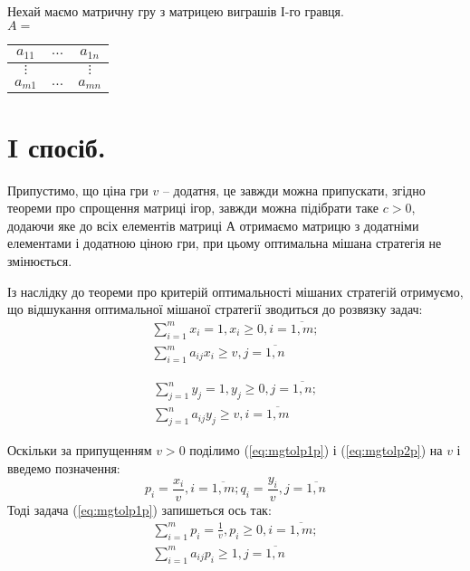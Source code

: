 \documentclass[12pt,a4paper]{report}
\begin{document}
Нехай маємо матричну гру з матрицею виграшів І-го гравця.\\
$A =$
\begin{tabular}{|c|c|c|}
\hline
$a_{1 1}$&$\dots$&$a_{1 n}$\\
\hline
$\vdots$&&$\vdots$\\
\hline
$a_{m 1}$&$\dots$&$a_{m n}$\\
\hline
\end{tabular}

\section{I спосіб.}

Припустимо, що ціна гри $v$ – додатня, це завжди можна припускати, згідно теореми про спрощення матриці ігор, завжди можна підібрати таке $c>0$, додаючи яке до всіх елементів матриці $А$ отримаємо матрицю з додатніми елементами і додатною ціною гри, при цьому оптимальна мішана стратегія не змінюється. 

Із наслідку до теореми про критерій оптимальності мішаних стратегій отримуємо, що відшукання оптимальної мішаної стратегії зводиться до розвязку задач:
\begin{equation}
\begin{array}{l}
\displaystyle \sum_{i=1}^m x_i = 1, x_i \geq 0, i=\overline{1,m};\\
\displaystyle \sum_{i=1}^m a_{ij} x_i \geq v,  j=\overline{1,n}
\end{array}
\label{eq:mgtolp1p}
\end{equation}

\begin{equation}
\begin{array}{l}
\displaystyle \sum_{j=1}^n y_j = 1, y_j \geq 0, j=\overline{1,n};\\
\displaystyle \sum_{j=1}^n a_{ij} y_j \geq v,  i=\overline{1,m}
\end{array}
\label{eq:mgtolp2p}
\end{equation}

Оскільки за припущенням $v>0$  поділимо (\ref{eq:mgtolp1p}) і (\ref{eq:mgtolp2p}) на $v$ і введемо позначення:
\[ \displaystyle p_i=\frac{x_i}{v},  i=\overline{1,m}; q_i=\frac{y_i}{v},  j=\overline{1,n} \]
Тоді задача (\ref{eq:mgtolp1p}) запишеться ось так:
\begin{equation}
\begin{array}{l}
\displaystyle \sum_{i=1}^m p_i = \frac{1}{v}, p_i \geq 0, i=\overline{1,m};\\
\displaystyle \sum_{i=1}^m a_{ij} p_i \geq 1,  j=\overline{1,n}
\end{array}
\label{eq:mgtolp1p2}
\end{equation}
\end{document}
